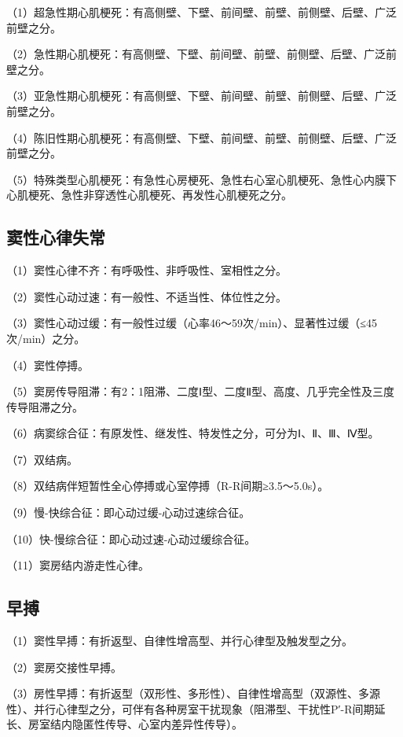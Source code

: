 （1）超急性期心肌梗死：有高侧壁、下壁、前间壁、前壁、前侧壁、后壁、广泛前壁之分。

（2）急性期心肌梗死：有高侧壁、下壁、前间壁、前壁、前侧壁、后壁、广泛前壁之分。

（3）亚急性期心肌梗死：有高侧壁、下壁、前间壁、前壁、前侧壁、后壁、广泛前壁之分。

（4）陈旧性期心肌梗死：有高侧壁、下壁、前间壁、前壁、前侧壁、后壁、广泛前壁之分。

（5）特殊类型心肌梗死：有急性心房梗死、急性右心室心肌梗死、急性心内膜下心肌梗死、急性非穿透性心肌梗死、再发性心肌梗死之分。

\protect\hypertarget{text00057.htmlux5cux23subid690}{}{}

\subsection{窦性心律失常}

（1）窦性心律不齐：有呼吸性、非呼吸性、室相性之分。

（2）窦性心动过速：有一般性、不适当性、体位性之分。

（3）窦性心动过缓：有一般性过缓（心率46～59次/min）、显著性过缓（≤45次/min）之分。

（4）窦性停搏。

（5）窦房传导阻滞：有2：1阻滞、二度Ⅰ型、二度Ⅱ型、高度、几乎完全性及三度传导阻滞之分。

（6）病窦综合征：有原发性、继发性、特发性之分，可分为Ⅰ、Ⅱ、Ⅲ、Ⅳ型。

（7）双结病。

（8）双结病伴短暂性全心停搏或心室停搏（R-R间期≥3.5～5.0s）。

（9）慢-快综合征：即心动过缓-心动过速综合征。

（10）快-慢综合征：即心动过速-心动过缓综合征。

（11）窦房结内游走性心律。

\protect\hypertarget{text00057.htmlux5cux23subid691}{}{}

\subsection{早搏}

（1）窦性早搏：有折返型、自律性增高型、并行心律型及触发型之分。

（2）窦房交接性早搏。

（3）房性早搏：有折返型（双形性、多形性）、自律性增高型（双源性、多源性）、并行心律型之分，可伴有各种房室干扰现象（阻滞型、干扰性P′-R间期延长、房室结内隐匿性传导、心室内差异性传导）。

